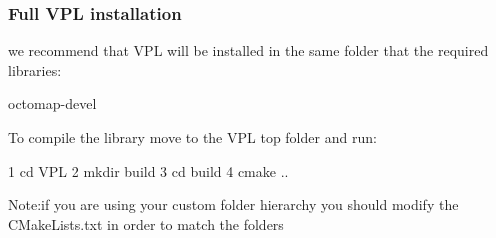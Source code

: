 \subsubsection*{Full V\+PL installation}

we recommend that V\+PL will be installed in the same folder that the required libraries\+:


\begin{DoxyItemize}
\item octomap-\/devel
\end{DoxyItemize}

To compile the library move to the V\+PL top folder and run\+:


\begin{DoxyCode}
1 cd VPL
2 mkdir build
3 cd build    
4 cmake ..
\end{DoxyCode}
 {\ttfamily Note\+:if you are using your custom folder hierarchy you should modify the C\+Make\+Lists.\+txt in order to match the folders} 